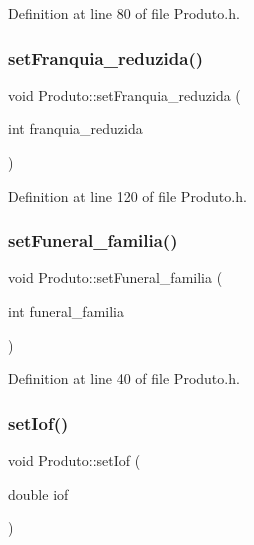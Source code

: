 Definition at line 80 of file Produto.\+h.

\hypertarget{class_produto_a35f48a657e128af8191285fc05ea6223}{}\label{class_produto_a35f48a657e128af8191285fc05ea6223} 
\subsubsection{\texorpdfstring{set\+Franquia\+\_\+reduzida()}{setFranquia\_reduzida()}}
{\footnotesize\ttfamily void Produto\+::set\+Franquia\+\_\+reduzida (\begin{DoxyParamCaption}\item[{int}]{franquia\+\_\+reduzida }\end{DoxyParamCaption})\hspace{0.3cm}{\ttfamily [inline]}}



Definition at line 120 of file Produto.\+h.

\hypertarget{class_produto_ac666bfeeb31e8c988a039efca68e7d79}{}\label{class_produto_ac666bfeeb31e8c988a039efca68e7d79} 
\subsubsection{\texorpdfstring{set\+Funeral\+\_\+familia()}{setFuneral\_familia()}}
{\footnotesize\ttfamily void Produto\+::set\+Funeral\+\_\+familia (\begin{DoxyParamCaption}\item[{int}]{funeral\+\_\+familia }\end{DoxyParamCaption})\hspace{0.3cm}{\ttfamily [inline]}}



Definition at line 40 of file Produto.\+h.

\hypertarget{class_produto_a12912055580ce4a6dbefd6ce926fd196}{}\label{class_produto_a12912055580ce4a6dbefd6ce926fd196} 
\subsubsection{\texorpdfstring{set\+Iof()}{setIof()}}
{\footnotesize\ttfamily void Produto\+::set\+Iof (\begin{DoxyParamCaption}\item[{double}]{iof }\end{DoxyParamCaption})\hspace{0.3cm}{\ttfamily [inline]}}



